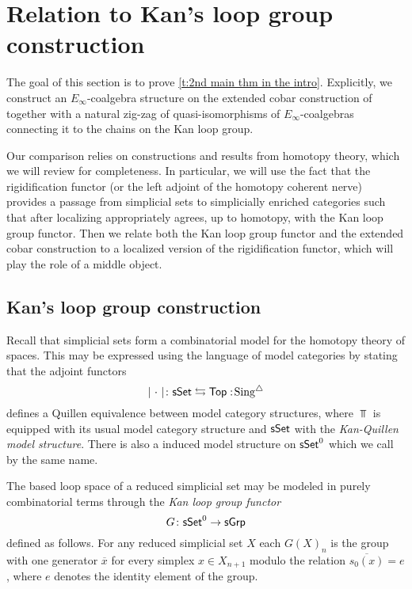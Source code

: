 
\section{Relation to Kan's loop group construction}

The goal of this section is to prove \cref{t:2nd main thm in the intro}.
Explicitly, we construct an $E_{\infty}$-coalgebra structure on the extended cobar construction of \cite{hess2010cobar} together with a natural zig-zag of quasi-isomorphisms of $E_{\infty}$-coalgebras connecting it to the chains on the Kan loop group. 

Our comparison relies on constructions and results from homotopy theory, which we will review for completeness. In particular, we will use the fact that the rigidification functor (or the left adjoint of the homotopy coherent nerve) provides a passage from simplicial sets to simplicially enriched categories such that after localizing appropriately agrees, up to homotopy, with the Kan loop group functor. Then we relate both the Kan loop group functor and the extended cobar construction to a localized version of the rigidification functor, which will play the role of a middle object. 

\subsection{Kan's loop group construction}

Recall that simplicial sets form a combinatorial model for the homotopy theory of spaces.
This may be expressed using the language of model categories by stating that the adjoint functors
\begin{equation*}
\vert{\ \cdot\ }\vert \colon \mathsf{sSet} \leftrightarrows \mathsf{Top} :\! \operatorname{Sing^{\triangle}}
\end{equation*}
defines a Quillen equivalence between model category structures, where $\Top$ is equipped with its usual model category structure and $\mathsf{sSet}$ with the \textit{Kan-Quillen model structure}.
There is also a induced model structure on $\mathsf{sSet}^0$ which we call by the same name.

The based loop space of a reduced simplicial set may be modeled in purely combinatorial terms through the \textit{Kan loop group functor} 
\begin{equation*}
G \colon \mathsf{sSet}^0 \to \mathsf{sGrp}
\end{equation*}
defined as follows.
For any reduced simplicial set $X$ each $G(X)_n$ is the group with one generator $\overline{x}$ for every simplex $x \in X_{n+1}$ modulo the relation $\overline{s_0(x)} = e$, where $e$ denotes the identity element of the group.  

